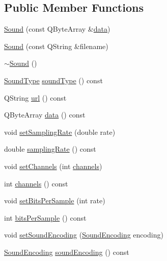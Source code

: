 \subsection*{Public Member Functions}
\begin{DoxyCompactItemize}
\item 
\hyperlink{classOkular_1_1Sound_af51dfd3e890d2293671dfae7dd87abf7}{Sound} (const Q\+Byte\+Array \&\hyperlink{classOkular_1_1Sound_ae06d3ef59d5d89556e0c43a4f9a1d3e9}{data})
\item 
\hyperlink{classOkular_1_1Sound_ae12942bd1bab67e14232296bdbdef112}{Sound} (const Q\+String \&filename)
\item 
\hyperlink{classOkular_1_1Sound_a0907389078bf740be2a5763366ad3376}{$\sim$\+Sound} ()
\item 
\hyperlink{classOkular_1_1Sound_aed586d1d0455f4309b1309b9954d5c04}{Sound\+Type} \hyperlink{classOkular_1_1Sound_a6ad3b22679e6a6db9d69230ce94bf247}{sound\+Type} () const 
\item 
Q\+String \hyperlink{classOkular_1_1Sound_a43f2240722f01fae2d962d5f186f0015}{url} () const 
\item 
Q\+Byte\+Array \hyperlink{classOkular_1_1Sound_ae06d3ef59d5d89556e0c43a4f9a1d3e9}{data} () const 
\item 
void \hyperlink{classOkular_1_1Sound_a4be8e371220885251a6effe3cf340349}{set\+Sampling\+Rate} (double rate)
\item 
double \hyperlink{classOkular_1_1Sound_a86ba4fda5dd2fb063ee8f6a4467c5130}{sampling\+Rate} () const 
\item 
void \hyperlink{classOkular_1_1Sound_aa0c02b65856e96fe47ee8bb65e1fe693}{set\+Channels} (int \hyperlink{classOkular_1_1Sound_ad548ffd58ee6bcc3dedfaa5b712ed5e2}{channels})
\item 
int \hyperlink{classOkular_1_1Sound_ad548ffd58ee6bcc3dedfaa5b712ed5e2}{channels} () const 
\item 
void \hyperlink{classOkular_1_1Sound_aae4a171bb2acd75280372ebda96516e5}{set\+Bits\+Per\+Sample} (int rate)
\item 
int \hyperlink{classOkular_1_1Sound_a5b1d1e158b15b1a3b8e7c535a5f384f5}{bits\+Per\+Sample} () const 
\item 
void \hyperlink{classOkular_1_1Sound_aea9528cfcab890f5231318880e51839f}{set\+Sound\+Encoding} (\hyperlink{classOkular_1_1Sound_a4bc04dce6aa25c5aadb2f93d0fafe5f8}{Sound\+Encoding} encoding)
\item 
\hyperlink{classOkular_1_1Sound_a4bc04dce6aa25c5aadb2f93d0fafe5f8}{Sound\+Encoding} \hyperlink{classOkular_1_1Sound_a19de5fefeba80f5e5dd1dff4cd866551}{sound\+Encoding} () const 
\end{DoxyCompactItemize}


